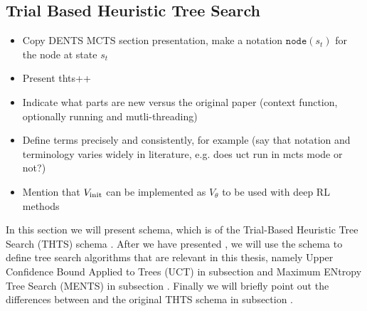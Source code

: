     \subsection{Trial Based Heuristic Tree Search}
    \label{sec:2-2-1-thts}
    
        \begin{itemize}
            \item{Copy DENTS MCTS section presentation, make a notation } $\texttt{node}(s_t)$ for the node at state $s_t$
            \item Present thts++
            \item Indicate what parts are new versus the original paper (context function, optionally running \mctsmode\ewe and mutli-threading)
            \item Define terms precisely and consistently, for example \mctsmode\ewe (say that notation and terminology varies widely in literature, e.g. does uct run in mcts mode or not?)
            \item Mention that $V_{\text{init}}$ can be implemented as $V_\theta$ to be used with deep RL methods
        \end{itemize}



        In this section we will present \thtspp schema, which is  of the Trial-Based Heuristic Tree Search (THTS) schema . After we have presented \thtspp, we will use the schema to define tree search algorithms that are relevant in this thesis, namely Upper Confidence Bound Applied to Trees (UCT)  in subsection  and Maximum ENtropy Tree Search (MENTS) in subsection . Finally we will briefly point out the differences between \thtspp and the original THTS schema in subsection .


